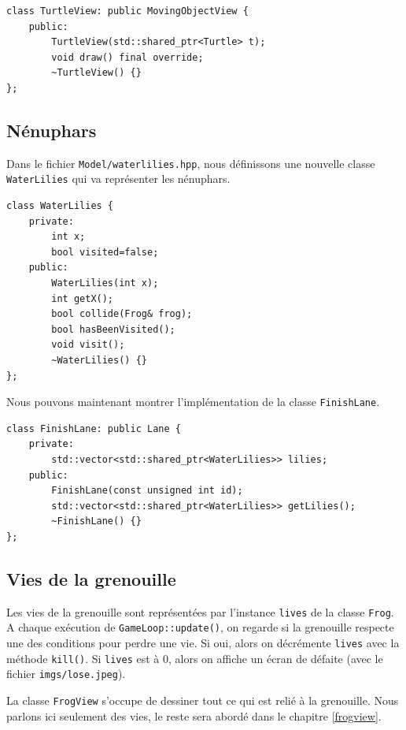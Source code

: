 \documentclass[a4paper, 12pt]{article}
\begin{document}
\begin{lstlisting}
class TurtleView: public MovingObjectView {
    public:
        TurtleView(std::shared_ptr<Turtle> t);
        void draw() final override;
        ~TurtleView() {}
};
\end{lstlisting}

\subsection{Nénuphars} \label{lilies}

Dans le fichier \texttt{Model/waterlilies.hpp}, 
nous définissons une nouvelle classe \texttt{WaterLilies} qui va représenter les nénuphars. 

\begin{lstlisting}
class WaterLilies {
    private:
        int x;
        bool visited=false;
    public:
        WaterLilies(int x);
        int getX();
        bool collide(Frog& frog);
        bool hasBeenVisited();
        void visit();
        ~WaterLilies() {}
};
\end{lstlisting} \hspace{0.5cm}

Nous pouvons maintenant montrer l'implémentation de la classe \texttt{FinishLane}.

\begin{lstlisting}
class FinishLane: public Lane {
    private:
        std::vector<std::shared_ptr<WaterLilies>> lilies;
    public:
        FinishLane(const unsigned int id);
        std::vector<std::shared_ptr<WaterLilies>> getLilies();
        ~FinishLane() {}
};
\end{lstlisting} \hspace{0.5cm}

\subsection{Vies de la grenouille} \label{lives}

Les vies de la grenouille sont représentées par l'instance \texttt{lives} de la classe 
\texttt{Frog}. 
A chaque exécution de \texttt{GameLoop::update()}, 
on regarde si la grenouille respecte une des conditions pour perdre une vie. 
Si oui, alors on décrémente \texttt{lives} avec la méthode \texttt{kill()}. 
Si \texttt{lives} est à 0, 
alors on affiche un écran de défaite (avec le fichier \texttt{imgs/lose.jpeg}).

La classe \texttt{FrogView} s'occupe de dessiner tout ce qui est relié à la grenouille. 
Nous parlons ici seulement des vies, le reste sera abordé dans le chapitre \ref{frogview}. 
\end{document}
